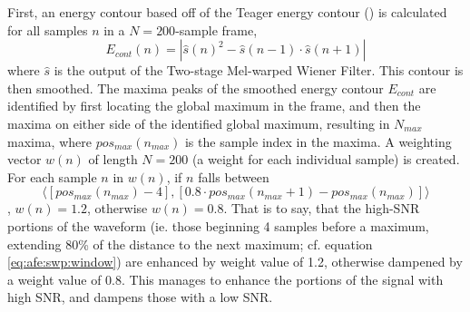 First, an energy contour based off of the Teager energy contour (\cite{teager:80}) is calculated for all samples $n$ in a $N=200$-sample frame, \begin{equation} E_{cont}(n) = |\hat{s}(n)^2 - \hat{s}(n-1) \cdot \hat{s}(n+1)| \end{equation} where $\hat{s}$ is the output of the Two-stage Mel-warped Wiener Filter.  This contour is then smoothed.  The maxima peaks of the smoothed energy contour $E_{cont}$ are identified by first locating the global maximum in the frame, and then the maxima on either side of the identified global maximum, resulting in $N_{max}$ maxima, where $pos_{max}(n_{max})$ is the sample index in the maxima. A weighting vector $w(n)$ of length $N=200$ (a weight for each individual sample) is created.  For each sample $n$ in $w(n)$, if $n$ falls between \begin{equation}\label{eq:afe:swp:window} \langle [pos_{max}(n_{max})-4], [0.8 \cdot pos_{max}(n_{max}+1)-pos_{max}(n_{max})] \rangle \end{equation}, $w(n) = 1.2$, otherwise $w(n) = 0.8$. That is to say, that the high-SNR portions of the waveform (ie. those beginning 4 samples before a maximum, extending 80\% of the distance to the next maximum; cf. equation \ref{eq:afe:swp:window}) are enhanced by weight value of 1.2, otherwise dampened by a weight value of 0.8.  This manages to enhance the portions of the signal with high SNR, and dampens those with a low SNR.

